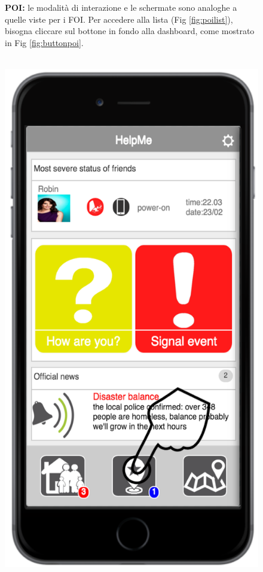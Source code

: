  \begin{figure}
\textbf{POI:} le modalità di interazione e le schermate sono analoghe a quelle viste per i FOI. Per accedere alla lista (Fig \ref{fig:poilist}), bisogna cliccare sul bottone in fondo alla dashboard, come mostrato in Fig \ref{fig:buttonpoi}.
 \\ \\
 \begin{minipage}[b]{6cm}
   \centering
	\includegraphics[scale=0.6]{interfaccia/buttonpoi.png}

\end{minipage}
\end{figure}
